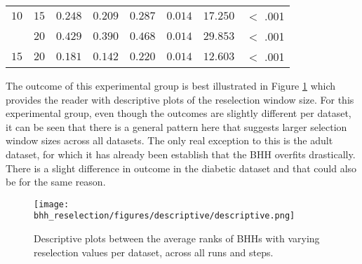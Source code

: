 \begin{table}[htbp]
{\begin{tabular}{lrrrrrrr}
                  $10$                 & $15$                 & $0.248$              & $0.209$                                         & $0.287$              & $0.014$              & $17.250$             & $<$ .001    \\
                  $ $                  & $20$                 & $0.429$              & $0.390$                                         & $0.468$              & $0.014$              & $29.853$             & $<$ .001    \\
                  $15$                 & $20$                 & $0.181$              & $0.142$                                         & $0.220$              & $0.014$              & $12.603$             & $<$ .001    \\
                  \bottomrule
            \end{tabular}
      }
\end{table}

The outcome of this experimental group is best illustrated in Figure \ref{fig:results:reselection:descriptive:descriptive} which provides the reader with descriptive plots of the reselection window size. For this experimental group, even though the outcomes are slightly different per dataset, it can be seen that there is a general pattern here that suggests larger selection window sizes across all datasets. The only real exception to this is the adult dataset, for which it has already been establish that the \Ac{BHH} overfits drastically. There is a slight difference in outcome in the diabetic dataset and that could also be for the same reason.

\begin{figure}[htbp]
      \centering
      \texttt{[image: bhh\_reselection/figures/descriptive/descriptive.png]}
      \caption{Descriptive plots between the average ranks of \Acsp{BHH} with varying reselection values per dataset, across all runs and steps.}
      \label{fig:results:reselection:descriptive:descriptive}
\end{figure}

